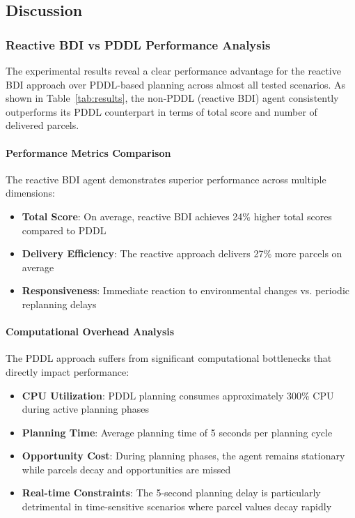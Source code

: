 \subsection{Discussion}

\subsubsection{Reactive BDI vs PDDL Performance Analysis}

The experimental results reveal a clear performance advantage for the reactive BDI approach over PDDL-based planning across almost all tested scenarios. As shown in Table~\ref{tab:results}, the non-PDDL (reactive BDI) agent consistently outperforms its PDDL counterpart in terms of total score and number of delivered parcels.

\paragraph{Performance Metrics Comparison}
The reactive BDI agent demonstrates superior performance across multiple dimensions:
\begin{itemize}
    \item \textbf{Total Score}: On average, reactive BDI achieves 24\% higher total scores compared to PDDL
    \item \textbf{Delivery Efficiency}: The reactive approach delivers 27\% more parcels on average
    \item \textbf{Responsiveness}: Immediate reaction to environmental changes vs. periodic replanning delays
\end{itemize}

\paragraph{Computational Overhead Analysis}
The PDDL approach suffers from significant computational bottlenecks that directly impact performance:
\begin{itemize}
    \item \textbf{CPU Utilization}: PDDL planning consumes approximately 300\% CPU during active planning phases
    \item \textbf{Planning Time}: Average planning time of 5 seconds per planning cycle
    \item \textbf{Opportunity Cost}: During planning phases, the agent remains stationary while parcels decay and opportunities are missed
    \item \textbf{Real-time Constraints}: The 5-second planning delay is particularly detrimental in time-sensitive scenarios where parcel values decay rapidly
\end{itemize}

